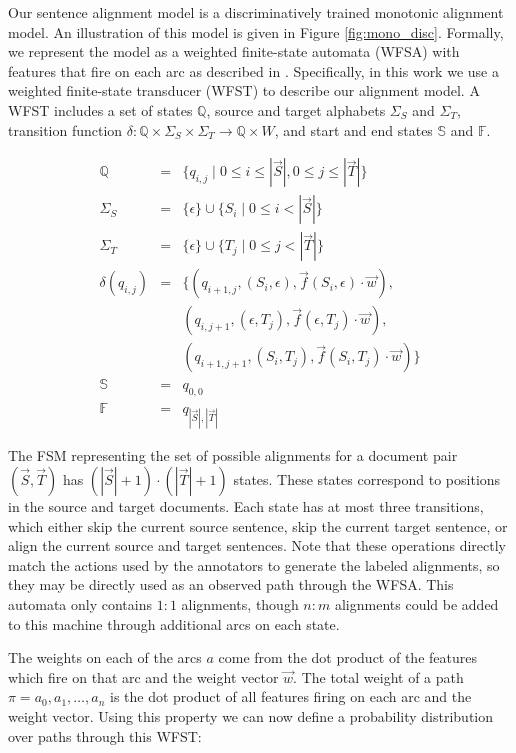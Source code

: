 Our sentence alignment model is a discriminatively trained monotonic alignment
model. An illustration of this model is given in Figure \ref{fig:mono_disc}.
Formally, we represent the model as a weighted finite-state automata (WFSA) with features
that fire on each arc as described in \citet{Eisner02}. Specifically, in this
work we use a weighted finite-state transducer (WFST) to describe our alignment
model. A WFST includes a set of states
$\mathbb{Q}$, source and target alphabets $\Sigma_S$ and $\Sigma_T$,
transition function $\delta : \mathbb{Q} \times \Sigma_S \times \Sigma_T
\longrightarrow \mathbb{Q} \times W$,
and start and end states $\mathbb{S}$ and $\mathbb{F}$.

\begin{align*}
\mathbb{Q} &=& \{q_{i,j} \mid 0 \leq i \leq |\vec{S}|, 0 \leq j \leq |\vec{T}|\}\\
\Sigma_S &=& \{\epsilon\} \cup \{S_i \mid 0 \leq i < |\vec{S}|\}\\
\Sigma_T &=& \{\epsilon\} \cup \{T_j \mid 0 \leq j < |\vec{T}|\}\\
\delta(q_{i, j}) &=& \{(q_{i+1, j}, (S_i, \epsilon), \vec{f}(S_i, \epsilon)\cdot\vec{w}),\\
& & (q_{i, j+1}, (\epsilon, T_j), \vec{f}(\epsilon, T_j)\cdot\vec{w}),\\
& & (q_{i+1,j+1}, (S_i, T_j), \vec{f}(S_i, T_j)\cdot\vec{w})\}\\
\mathbb{S} &=& q_{0,0}\\
\mathbb{F} &=& q_{|\vec{S}|, |\vec{T}|}
\end{align*}


The FSM representing the set of possible alignments for a document pair 
$(\vec{S}, \vec{T})$ has $(|\vec{S}|+1)\cdot(|\vec{T}|+1)$ states. These states
correspond to positions in the source and target documents. Each state has at
most three transitions, which either skip the current source sentence, skip the
current target sentence, or align the current source and target sentences. Note
that these operations directly match the actions used by the annotators to
generate the labeled alignments, so they may be directly used as an observed
path through the WFSA. This automata only contains $1:1$ alignments, though
$n:m$ alignments could be added to this machine through additional arcs on each
state.

The weights on each of the arcs $a$ come from the dot product of the features which
fire on that arc and the weight vector $\vec{w}$. 
The total weight of a path $\pi = a_0,a_1,\dots,a_n$ is the dot product of all
features firing on each arc and the weight vector. Using this property we can
now define a probability distribution over paths through this WFST:

